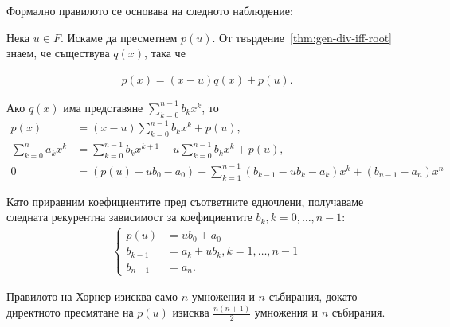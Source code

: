 \documentclass[numbers=endperiod, bibliography=totocnumbered]{scrartcl}
\begin{document}
Формално правилото се основава на следното наблюдение:

Нека \( u \in F \). Искаме да пресметнем \( p(u) \). От твърдение~\ref{thm:gen-div-iff-root} знаем, че съществува \( q(x) \), така че

\begin{align*}
  p(x) = (x - u) q(x) + p(u).
\end{align*}

Ако \( q(x) \) има представяне \( \sum_{k=0}^{n-1} b_k x^k \), то
\begin{align*}
  p(x)
  &=
  (x - u) \sum_{k=0}^{n-1} b_k x^k + p(u),
  \\
  \sum_{k=0}^n a_k x^k
  &=
  \sum_{k=0}^{n-1} b_k x^{k+1} - u \sum_{k=0}^{n-1} b_k x^k + p(u),
  \\
  0
  &=
  (p(u) - u b_0 - a_0) + \sum_{k=1}^{n-1} (b_{k-1} - u b_k - a_k) x^k + (b_{n-1} - a_n) x^n
\end{align*}

Като приравним коефициентите пред съответните едночлени, получаваме следната рекурентна зависимост за коефициентите \( b_k, k = 0, \ldots, n - 1 \):
\begin{align*}
  \begin{cases}
    p(u) &= u b_0 + a_0 \\
    b_{k-1} &= a_k + u b_k, k = 1, \ldots, n - 1 \\
    b_{n-1} &= a_n.
  \end{cases}
\end{align*}

Правилото на Хорнер изисква само \( n \) умножения и \( n \) събирания, докато директното пресмятане на \( p(u) \) изисква \( \frac {n(n+1)} 2 \) умножения и \( n \) събирания.
\end{document}
